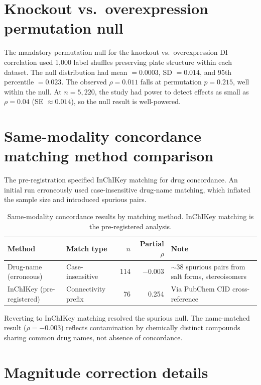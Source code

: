\documentclass[11pt]{article}
\begin{document}
\section{Knockout vs.\ overexpression permutation null}
\label{app:permutation}

The mandatory permutation null for the knockout vs.\
overexpression DI correlation used 1{,}000 label shuffles preserving
plate structure within each dataset.  The null distribution had mean
$= 0.0003$, SD $= 0.014$, and 95th percentile $= 0.023$.  The observed
$\rho = 0.011$ falls at permutation $p = 0.215$, well within the null.
At $n = 5{,}220$, the study had power to detect effects as small as
$\rho = 0.04$ (SE $\approx 0.014$), so the null result is well-powered.

\section{Same-modality concordance matching method comparison}
\label{app:a1matching}

The pre-registration specified InChIKey matching for drug concordance.
An initial run erroneously used case-insensitive drug-name matching,
which inflated the sample size and introduced spurious pairs.

\vspace{1em}
\begin{table}[h]
\centering
\caption{Same-modality concordance results by matching method.  InChIKey
matching is the pre-registered analysis.}
\label{tab:a1match}
\small
\begin{tabular}{llrrp{4cm}}
\toprule
Method & Match type & $n$ & Partial $\rho$ & Note \\
\midrule
Drug-name (erroneous) & Case-insensitive & 114 & $-0.003$ &
  ${\sim}$38 spurious pairs from salt forms, stereoisomers \\
InChIKey (pre-registered) & Connectivity prefix & 76 & 0.254 &
  Via PubChem CID cross-reference \\
\bottomrule
\end{tabular}
\end{table}

Reverting to InChIKey matching resolved the spurious null.  The
name-matched result ($\rho = -0.003$) reflects contamination by
chemically distinct compounds sharing common drug names, not absence of
concordance.

\section{Magnitude correction details}
\label{app:magnitude}
\end{document}
